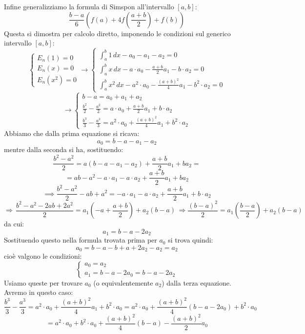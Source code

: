 \documentclass[a4paper,11pt]{article}
\begin{document}
Infine generalizziamo la formula di Simspon all'intervallo $[a, b]$:
$$
\frac{b - a}{6} \left( f(a) + 4 f\left( \frac{a + b}{2} \right) + f(b) \right)
$$
Questa si dimostra per calcolo diretto, imponendo le condizioni sul generico intervallo $[a, b]$:
\[
	\begin{cases}
		E_n(1) = 0 \\ 
		E_n(x) = 0 \\ 
		E_n(x^2) = 0
	\end{cases}
	\rightarrow
	\begin{cases}
		\int_a^b 1 \, dx - a_0 - a_1 - a_2 = 0 \\ 
		\int_a^b x \, dx - a \cdot a_0 - \frac{a + b}{2} a_1 - b \cdot a_2 = 0 \\ 
		\int_a^b x^2 \, dx - a^2 \cdot a_0 - \frac{(a+b)^2}{4} a_1 - b^2 \cdot a_2 = 0
	\end{cases}
\]
\[
	\rightarrow 
	\begin{cases}
		b - a = a_0 + a_1 + a_2 \\ 
		\frac{b^2}{2} - \frac{a^2}{2} = a \cdot a_0 + \frac{a + b}{2} a_1 + b \cdot a_2 \\ 
		\frac{b^3}{3} - \frac{a^3}{3} = a^2 \cdot a_0 + \frac{(a + b)^2}{4} a_1 + b^2 \cdot a_2
	\end{cases}
\]
Abbiamo che dalla prima equazione si ricava:
$$
a_0 = b - a - a_1 - a_2
$$
mentre dalla seconda si ha, sostituendo:
$$
\frac{b^2 - a^2}{2} = a(b - a - a_1 - a_2) + \frac{a + b}{2} a_1 + b a_2 =
$$
$$
= ab - a^2 - a \cdot a_1 - a \cdot a_2 + \frac{a + b}{2} a_1 + b a_2
$$
$$
\implies \frac{b^2 - a^2}{2} - ab + a^2 = -a \cdot a_1 - a \cdot a_2 + \frac{a + b}{2} a_1 + b \cdot a_2
$$
$$
\Rightarrow \, \frac{b^2 - a^2 - 2ab + 2a^2}{2} = a_1 \left( -a + \frac{a + b}{2} \right) + a_2 (b - a) \, \Rightarrow \frac{(b-a)^2}{2} = a_1 \left( \frac{b - a}{2} \right) + a_2 (b - a)
$$
da cui:
$$
a_1 = b - a - 2 a_2
$$
Sostituendo questo nella formula trovata prima per $a_0$ si trova quindi:
$$
a_0 = b - a - b + a + 2 a_2 - a_2 = a_2
$$
cioè valgono le condizioni:
\[
	\begin{cases}
		a_0 = a_2 \\ 
		a_1 = b - a - 2 a_0 = b - a - 2 a_2
	\end{cases}
\]
Usiamo queste per trovare $a_0$ (o equivalentemente $a_2$) dalla terza equazione.
Avremo in questo caso:
$$
\frac{b^3}{3} - \frac{a^3}{3} = a^2 \cdot a_0 + \frac{(a + b)^2}{4} a_1 + b^2 \cdot a_0
= a^2 \cdot a_0 + \frac{(a + b)^2}{4} (b - a - 2a_0) + b^2 \cdot a_0
$$
$$
= a^2 \cdot a_0 + b^2 \cdot a_0 + \frac{(a + b)^2}{4} (b - a) - \frac{(a + b)^2}{2} a_0
$$
\end{document}
